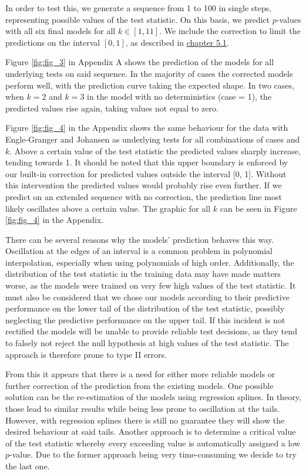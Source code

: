 \documentclass[12pt,a4paper]{article}
\begin{document}
In order to test this, we generate a sequence from 1 to 100 in single
steps, representing possible values of the test statistic. On this
basis, we predict \(p\)-values with all six final models for all
\(k \in [1, 11]\). We include the correction to limit the predictions on
the interval \([0, 1]\), as described in
\protect\hyperlink{rmse-comparison}{chapter 5.1}.

Figure \ref{fig:fig_3} in Appendix A shows the prediction of the models
for all underlying tests on said sequence. In the majority of cases the
corrected models perform well, with the prediction curve taking the
expected shape. In two cases, when \(k = 2\) and \(k = 3\) in the model
with no deterministics (case = 1), the predicted values rise again,
taking values not equal to zero.

Figure \ref{fig:fig_4} in the Appendix shows the same behaviour for the
data with Engle-Granger and Johansen as underlying tests for all
combinations of cases and \(k\). Above a certain value of the test
statistic the predicted values sharply increase, tending towards 1. It
should be noted that this upper boundary is enforced by our built-in
correction for predicted values outside the interval {[}0, 1{]}. Without
this intervention the predicted values would probably rise even further.
If we predict on an extended sequence with no correction, the prediction
line most likely oscillates above a certain value. The graphic for all
\(k\) can be seen in Figure \ref{fig:fig_4} in the Appendix.

There can be several reasons why the models' prediction behaves this
way. Oscillation at the edges of an interval is a common problem in
polynomial interpolation, especially when using polynomials of high
order. Additionally, the distribution of the test statistic in the
training data may have made matters worse, as the models were trained on
very few high values of the test statistic. It must also be considered
that we chose our models according to their predictive performance on
the lower tail of the distribution of the test statistic, possibly
neglecting the predictive performance on the upper tail. If this
incident is not rectified the models will be unable to provide reliable
test decisions, as they tend to falsely not reject the null hypothesis
at high values of the test statistic. The approach is therefore prone to
type II errors.

From this it appears that there is a need for either more reliable
models or further correction of the prediction from the existing models.
One possible solution can be the re-estimation of the models using
regression splines. In theory, those lead to similar results while being
less prone to oscillation at the tails. However, with regression splines
there is still no guarantee they will show the desired behaviour at said
tails. Another approach is to determine a critical value of the test
statistic whereby every exceeding value is automatically assigned a low
\(p\)-value. Due to the former approach being very time-consuming we
decide to try the last one.
\end{document}
